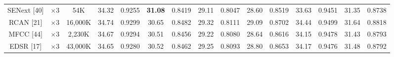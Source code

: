 \documentclass[twocolumn]{svjour3}          %
\begin{document}
\begin{table}
\begin{tabular}{|c|c|c|cc|cc|cc|cc|cc|cc|}
SENext [40] & $\times3$ &54K& \multicolumn{1}{c|}{34.32} &{0.9255}& \multicolumn{1}{c|}{\color{red}\textbf{31.08}} & {0.8419} & \multicolumn{1}{c|}{29.11} &{0.8047}& \multicolumn{1}{c|}{28.60} &{0.8519}& \multicolumn{1}{c|}{33.63} &{0.9451} &\multicolumn{1}{c|}{31.35} &{0.8738} \\


RCAN [21]& $\times3$ &16,000K& \multicolumn{1}{c|}{34.74} & 0.9299 & \multicolumn{1}{c|}{30.65} & 0.8482 &\multicolumn{1}{c|}{29.32} & 0.8111& \multicolumn{1}{c|}{29.09} & 0.8702 & \multicolumn{1}{c|}{34.44} & 0.9499
&\multicolumn{1}{c|}{31.64} & 0.8818\\


MFCC [44]& $\times 3$&2,230K& \multicolumn{1}{c|}{34.67} & 0.9294 & \multicolumn{1}{c|}{30.51} &0.8456 &\multicolumn{1}{c|}{29.22} & 0.8080& \multicolumn{1}{c|}{28.64} & 0.8616 & \multicolumn{1}{c|}{34.15} & 0.9478
&\multicolumn{1}{c|}{31.43} & 0.8793\\



EDSR [17]& $\times3$&43,000K& \multicolumn{1}{c|}{34.65} & 0.9280 & \multicolumn{1}{c|}{30.52} & 0.8462 &\multicolumn{1}{c|}{29.25} & 0.8093& \multicolumn{1}{c|}{28.80} & 0.8653 & \multicolumn{1}{c|}{34.17} & 0.9476
&\multicolumn{1}{c|}{31.48} &0.8792\\


\end{tabular}
\end{table}
\end{document}
